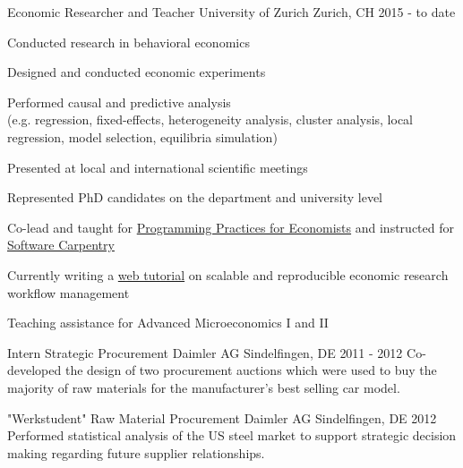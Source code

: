 
\begin{section}[Experience]

  \entry%
  {Economic Researcher and Teacher} %
  {University of Zurich} %
  {Zurich, CH} %
  {2015 - to date} %
  {%
    \begin{entrylist}
      \item Conducted research in behavioral economics
      \item Designed and conducted economic experiments
      \item Performed causal and predictive analysis \\ (e.g. regression, fixed-effects, heterogeneity analysis, cluster analysis, local regression, model selection, equilibria simulation)
      \item Presented at local and international scientific meetings
      \item Represented PhD candidates on the department and university level
      \item Co-lead and taught for \href{https://pp4rs.github.io/}{ Programming Practices for Economists} and instructed for \href{https://uzhcrs.github.io/2019-02-07-zurich/}{ Software Carpentry}
      \item Currently writing a \href{https://lachlandeer.github.io/snakemake-econ-r-tutorial/}{ web tutorial} on scalable and reproducible economic research workflow management
      \item Teaching assistance for Advanced Microeconomics I and II
    \end{entrylist}
  }%

  \entry%
    {Intern Strategic Procurement} %
    {Daimler AG} %
    {Sindelfingen, DE} %
    {2011 - 2012} %
    {%
     Co-developed the design of two procurement auctions which were used to buy the majority of raw materials for the manufacturer's best selling car model.
    }%

    \entry%
    {"Werkstudent" Raw Material Procurement} %
    {Daimler AG} %
    {Sindelfingen, DE} %
    {2012} %
    {%
    Performed statistical analysis of the US steel market to support strategic decision making regarding future supplier relationships.
    }%
\end{section}

